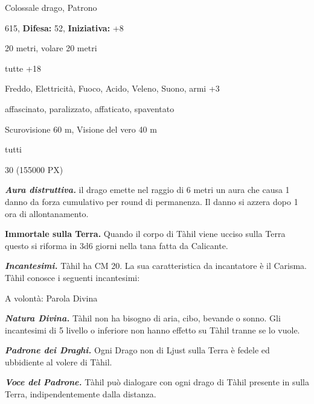 \begin{multicols}{2}
{
\noindent
\begin{description}[noitemsep, topsep=0pt, parsep=0pt, partopsep=0pt, leftmargin=0cm, labelwidth=2.2cm]
	\item[\textbf{Taglia/Tipo:}] Colossale drago, Patrono
	\item[\textbf{Caratt.:}] 
	\item[\textbf{Punti Ferita:}] 615,  \textbf{Difesa:} 52,  \textbf{Iniziativa:} +8
	\item[\textbf{Movimento:}] 20 metri, volare 20 metri
	\item[\textbf{Tiri Salvez.:}] 
	\item[\textbf{Comp.:}] tutte +18
	\item[\textbf{Imm. Danni:}] Freddo, Elettricità, Fuoco, Acido, Veleno, Suono, armi +3
	\item[\textbf{Immunità:}] affascinato, paralizzato, affaticato, spaventato
	\item[\textbf{Sensi:}] Scurovisione 60 m, Visione del vero 40 m
	\item[\textbf{Linguaggi:}] tutti
	\item[\textbf{Sfida:}] 30 (155000 PX)\smallskip
\end{description}

\emph{\textbf{Aura distruttiva.}} il drago emette nel raggio di 6 metri un aura che causa 1 danno da forza cumulativo per round di permanenza. Il danno si azzera dopo 1 ora di allontanamento.

\textbf{Immortale sulla Terra.} Quando il corpo di Tàhil viene ucciso sulla Terra questo si riforma in 3d6 giorni nella tana fatta da Calicante.

\emph{\textbf{Incantesimi.}} Tàhil ha CM 20. La sua caratteristica da incantatore è il Carisma. Tàhil conosce i seguenti incantesimi:

A volontà: Parola Divina

\emph{\textbf{Natura Divina.}} Tàhil non ha bisogno di aria, cibo, bevande o sonno. Gli incantesimi di 5 livello o inferiore non hanno effetto su Tàhil tranne se lo vuole.

\emph{\textbf{Padrone dei Draghi.}} Ogni Drago non di Ljust sulla Terra è fedele ed ubbidiente al volere di Tàhil.

\emph{\textbf{Voce del Padrone.}} Tàhil può dialogare con ogni drago di Tàhil presente in sulla Terra, indipendentemente dalla distanza.

}
\end{multicols}

